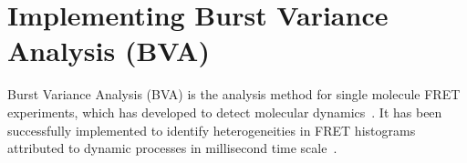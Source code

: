 \section{Implementing Burst Variance Analysis (BVA)}


Burst Variance Analysis (BVA) is the analysis method for single molecule FRET experiments, which has developed to detect molecular dynamics~\cite{Torella_2011}. It has been successfully implemented to identify heterogeneities in FRET histograms attributed to dynamic processes in millisecond time scale~\cite{Torella_2011}\cite{Robb_2013}.
